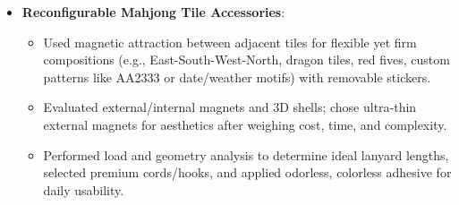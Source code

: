 \documentclass{resume}
\begin{document}
{\begin{itemize}
{\begin{itemize}
\begin{itemize}
			\item \textbf{Implementation Details}: For the mod-based approach, combined invincibility, infinite resources, double jump, one-hit kill, and character swap mods. Designed short- and long-distance auto-travel plus branch-aware path planning. Leveraged invincibility to reduce dev difficulty, speed mods to cut wait times, and auto return-to-start to minimize user input.
		\end{itemize}
	
	\item \textbf{Reconfigurable Mahjong Tile Accessories}:
	\begin{itemize}
		\item Used magnetic attraction between adjacent tiles for flexible yet firm compositions (e.g., East-South-West-North, dragon tiles, red fives, custom patterns like AA2333 or date/weather motifs) with removable stickers.
		
		\item Evaluated external/internal magnets and 3D shells; chose ultra-thin external magnets for aesthetics after weighing cost, time, and complexity.
		
		\item Performed load and geometry analysis to determine ideal lanyard lengths, selected premium cords/hooks, and applied odorless, colorless adhesive for daily usability.
	\end{itemize}
\end{itemize}
}

\end{itemize}%
}{}%
\end{document}
